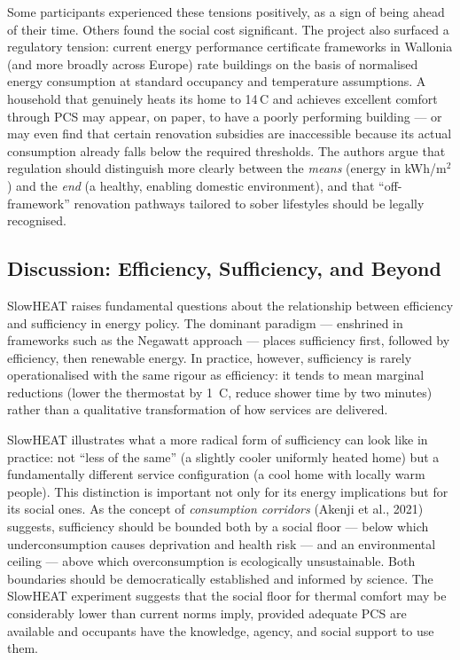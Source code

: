 Some participants experienced these tensions positively, as a
sign of being ahead of their time. Others found the social cost
significant. The project also surfaced a regulatory tension:
current energy performance certificate frameworks in Wallonia
(and more broadly across Europe) rate buildings on the basis
of normalised energy consumption at standard occupancy and
temperature assumptions. A household that genuinely heats its
home to 14\,\textdegree C and achieves excellent comfort through
PCS may appear, on paper, to have a poorly performing building
--- or may even find that certain renovation subsidies are
inaccessible because its actual consumption already falls below
the required thresholds. The authors argue that regulation should
distinguish more clearly between the \emph{means} (energy in
kWh/m$^2$) and the \emph{end} (a healthy, enabling domestic
environment), and that ``off-framework'' renovation pathways
tailored to sober lifestyles should be legally recognised.

\subsection{Discussion: Efficiency, Sufficiency, and Beyond}

SlowHEAT raises fundamental questions about the relationship
between efficiency and sufficiency in energy policy. The dominant
paradigm --- enshrined in frameworks such as the Negawatt approach
--- places sufficiency first, followed by efficiency, then
renewable energy. In practice, however, sufficiency is rarely
operationalised with the same rigour as efficiency: it tends to
mean marginal reductions (lower the thermostat by 1\,\textdegree
C, reduce shower time by two minutes) rather than a qualitative
transformation of how services are delivered.

SlowHEAT illustrates what a more radical form of sufficiency can
look like in practice: not ``less of the same'' (a slightly cooler
uniformly heated home) but a fundamentally different service
configuration (a cool home with locally warm people). This
distinction is important not only for its energy implications but
for its social ones. As the concept of \textit{consumption
corridors} (Akenji et al., 2021) suggests, sufficiency should
be bounded both by a social floor --- below which underconsumption
causes deprivation and health risk --- and an environmental ceiling
--- above which overconsumption is ecologically unsustainable.
Both boundaries should be democratically established and informed
by science. The SlowHEAT experiment suggests that the social
floor for thermal comfort may be considerably lower than current
norms imply, provided adequate PCS are available and occupants
have the knowledge, agency, and social support to use them.

